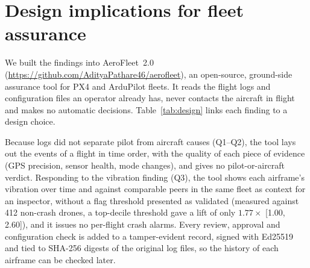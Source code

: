 \documentclass[preprint,12pt]{elsarticle}
\begin{document}
\FloatBarrier
\section{Design implications for fleet assurance}
\label{sec:tool}

We built the findings into AeroFleet~2.0 (\url{https://github.com/AdityaPathare46/aerofleet}), an open-source, ground-side assurance tool for PX4 and ArduPilot fleets. It reads the flight logs and configuration files an operator already has, never contacts the aircraft in flight and makes no automatic decisions. Table~\ref{tab:design} links each finding to a design choice.

Because logs did not separate pilot from aircraft causes (Q1--Q2), the tool lays out the events of a flight in time order, with the quality of each piece of evidence (GPS precision, sensor health, mode changes), and gives no pilot-or-aircraft verdict. Responding to the vibration finding (Q3), the tool shows each airframe's vibration over time and against comparable peers in the same fleet as context for an inspector, without a flag threshold presented as validated (measured against 412 non-crash drones, a top-decile threshold gave a lift of only $1.77\times$ [1.00, 2.60]), and it issues no per-flight crash alarms. Every review, approval and configuration check is added to a tamper-evident record, signed with Ed25519 and tied to SHA-256 digests of the original log files, so the history of each airframe can be checked later.
\end{document}
